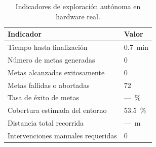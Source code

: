 \begin{table}[H]
\centering
\caption{Indicadores de exploración autónoma en hardware real.}
\label{tab:explore_real}
\begin{tabular}{ll}
\hline
\textbf{Indicador} & \textbf{Valor} \\
\hline
Tiempo hasta finalización          & 0.7~min \\
Número de metas generadas          & 0 \\
Metas alcanzadas exitosamente      & 0 \\
Metas fallidas o abortadas         & 72 \\
Tasa de éxito de metas             & ---~\% \\
Cobertura estimada del entorno     & 53.5~\% \\
Distancia total recorrida          & ---~m \\
Intervenciones manuales requeridas & 0 \\
\hline
\end{tabular}
\end{table}

